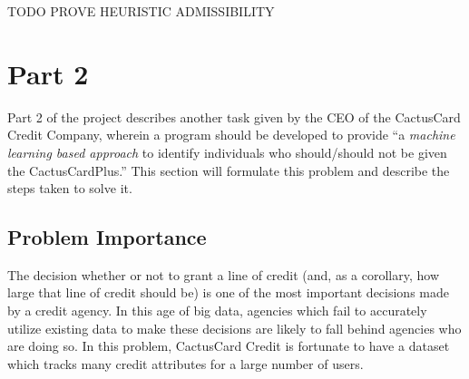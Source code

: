 \documentclass[11pt,journal]{IEEEtran}
\begin{document}
TODO PROVE HEURISTIC ADMISSIBILITY

\section{Part 2} \label{part2}
Part 2 of the project describes another task given by the CEO of the CactusCard Credit Company, wherein a program should be developed to provide ``a \emph{machine learning based approach} to identify individuals who should/should not be given the CactusCardPlus.'' This section will formulate this problem and describe the steps taken to solve it.

\subsection{Problem Importance}
The decision whether or not to grant a line of credit (and, as a corollary, how large that line of credit should be) is one of the most important decisions made by a credit agency. In this age of big data, agencies which fail to accurately utilize existing data to make these decisions are likely to fall behind agencies who are doing so. In this problem, CactusCard Credit is fortunate to have a dataset which tracks many credit attributes for a large number of users.
\end{document}

